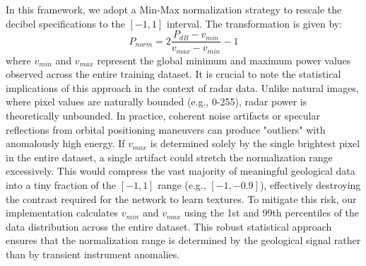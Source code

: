 In this framework, we adopt a Min-Max normalization strategy to rescale the decibel specifications to the $[-1, 1]$ interval. The transformation is given by:
\[ 
P_{norm} = 2 \frac{P_{dB} - v_{min}}{v_{max} - v_{min}} - 1 
\]
where $v_{min}$ and $v_{max}$ represent the global minimum and maximum power values observed across the entire training dataset.
It is crucial to note the statistical implications of this approach in the context of radar data.
Unlike natural images, where pixel values are naturally bounded (e.g., 0-255), radar power is theoretically unbounded.
In practice, coherent noise artifacts or specular reflections from orbital positioning maneuvers can produce "outliers" with anomalously high energy.
If $v_{max}$ is determined solely by the single brightest pixel in the entire dataset, a single artifact could stretch the normalization range excessively.
This would compress the vast majority of meaningful geological data into a tiny fraction of the $[-1, 1]$ range (e.g., $[-1, -0.9]$), effectively destroying the contrast required for the network to learn textures.
To mitigate this risk, our implementation calculates $v_{min}$ and $v_{max}$ using the 1st and 99th percentiles of the data distribution across the entire dataset.
This robust statistical approach ensures that the normalization range is determined by the geological signal rather than by transient instrument anomalies.

